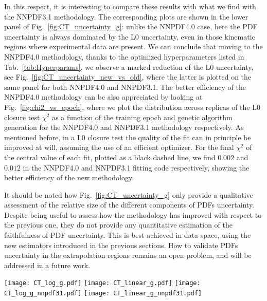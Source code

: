 In this respect, it is interesting to compare these results with what we find
with the NNPDF3.1 methodology. The corresponding plots are shown in the lower panel of
Fig.~\ref{fig:CT_uncertainty_g}: unlike the NNPDF4.0 case, here the PDF
uncertainty is always dominated by the L0 uncertainty, even in those kinematic
regions where experimental data are present. We can conclude that moving to the
NNPDF4.0 methodology, thanks to the optimized hyperparameters listed in Tab.~\ref{tab:Hyperparams},
we observe a marked reduction of the L0 uncertainty, 
see Fig.~\ref{fig:CT_uncertainty_new_vs_old}, where the latter is plotted on the same panel
for both NNPDF4.0 and NNPDF3.1. 
The better efficiency of the NNPDF4.0 methodology can be also appreciated
by looking at Fig.~\ref{fig:chi2_vs_epoch}, where we plot the distribution
across replicas of the L0 closure test $\chi^2$
as a function of the training epoch and genetic algorithm generation
for the NNPDF4.0 and NNPDF3.1 methodology respectively. As mentioned before, in a L0
closure test the quality of the fit can in principle be improved at will,
assuming the use of an efficient optimizer. For the final $\chi^2$ of the
central value of each fit, plotted as a black dashed line, we find $0.002$ and
$0.012$ in the NNPDF4.0 and NNPDF3.1 fitting code respectively, showing the better
efficiency of the new methodology. 

It should be noted how
Fig.~\ref{fig:CT_uncertainty_g}  only
provide a qualitative assessment of the relative size of the different
components of PDFs uncertainty. Despite being useful to assess how the
methodology has improved with respect to the previous one, they do not provide
any quantitative estimation of the faithfulness of PDF uncertainty. This is best
achieved in data space, using the new estimators introduced in the previous
sections.
How to validate PDFs uncertainty in the extrapolation regions remains an open problem,
and will be addressed in a future work.

\begin{figure*}[h]
    \centering
    \texttt{[image: CT\_log\_g.pdf]}
    \texttt{[image: CT\_linear\_g.pdf]}
    \texttt{[image: CT\_log\_g\_nnpdf31.pdf]}
    \texttt{[image: CT\_linear\_g\_nnpdf31.pdf]}
    \caption{Relative PDF error for the gluon distribution in the NNPDF4.0 (upper panel)
    and NNPDF3.1 (lower panel) methodology, plotted in logarithmic (left) and linear scale (right).}
    \label{fig:CT_uncertainty_g}    
\end{figure*}


